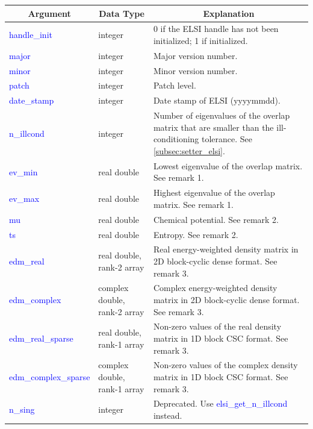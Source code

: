 \documentclass{report}
\begin{document}
\begin{tabular}[]{|p{30mm}|p{45mm}|p{90mm}|}
\hline
\multicolumn{1}{|c|}{\textbf{Argument}} & \multicolumn{1}{c|}{\textbf{Data Type}} & \multicolumn{1}{c|}{\textbf{Explanation}}\\
\hline
\textcolor{blue}{handle\_init}         & integer                      & 0 if the ELSI handle has not been initialized; 1 if initialized.\\
\hline
\textcolor{blue}{major}                & integer                      & Major version number.\\
\hline
\textcolor{blue}{minor}                & integer                      & Minor version number.\\
\hline
\textcolor{blue}{patch}                & integer                      & Patch level.\\
\hline
\textcolor{blue}{date\_stamp}          & integer                      & Date stamp of ELSI (yyyymmdd).\\
\hline
\textcolor{blue}{n\_illcond}           & integer                      & Number of eigenvalues of the overlap matrix that are smaller than the ill-conditioning tolerance. See \ref{subsec:setter_elsi}.\\
\hline
\textcolor{blue}{ev\_min}              & real double                  & Lowest eigenvalue of the overlap matrix. See remark 1.\\
\hline
\textcolor{blue}{ev\_max}              & real double                  & Highest eigenvalue of the overlap matrix. See remark 1.\\
\hline
\textcolor{blue}{mu}                   & real double                  & Chemical potential. See remark 2.\\
\hline
\textcolor{blue}{ts}                   & real double                  & Entropy. See remark 2.\\
\hline
\textcolor{blue}{edm\_real}            & real double, rank-2 array    & Real energy-weighted density matrix in 2D block-cyclic dense format. See remark 3.\\
\hline
\textcolor{blue}{edm\_complex}         & complex double, rank-2 array & Complex energy-weighted density matrix in 2D block-cyclic dense format. See remark 3.\\
\hline
\textcolor{blue}{edm\_real\_sparse}    & real double, rank-1 array    & Non-zero values of the real density matrix in 1D block CSC format. See remark 3.\\
\hline
\textcolor{blue}{edm\_complex\_sparse} & complex double, rank-1 array & Non-zero values of the complex density matrix in 1D block CSC format. See remark 3.\\
\hline
\textcolor{blue}{n\_sing}              & integer                      & Deprecated. Use \textcolor{blue}{elsi\_get\_n\_illcond} instead.\\
\hline
\end{tabular}
\end{document}
